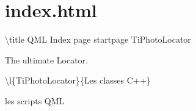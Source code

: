 \chapter{index.\+html}
\hypertarget{page4}{}\label{page4}
\textbackslash{}title QML Index page startpage Ti\+Photo\+Locator

The ultimate  Locator. \begin{DoxyItemize}
\item \textbackslash{}l\{Ti\+Photo\+Locator\}\{Les classes C++\} \item les scripts QML \end{DoxyItemize}
